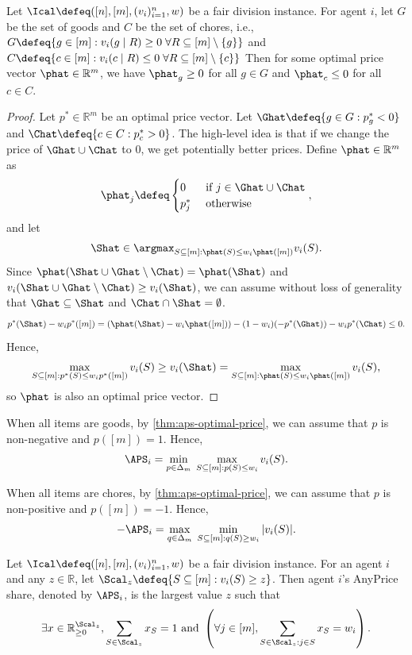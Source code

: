 \begin{lemma}
\label{thm:aps-optimal-price}
Let $\Ical \defeq ([n], [m], (v_i)_{i=1}^n, w)$ be a fair division instance.
For agent $i$, let $G$ be the set of goods and $C$ be the set of chores,
i.e., $G \defeq \{g \in [m]: v_i(g \mid R) \ge 0 \; \forall R \subseteq [m] \setminus \{g\}\}$
and $C \defeq \{c \in [m]: v_i(c \mid R) \le 0 \; \forall R \subseteq [m] \setminus \{c\}\}$
Then for some optimal price vector $\phat \in \mathbb{R}^m$, we have
$\phat_g \ge 0$ for all $g \in G$ and $\phat_c \le 0$ for all $c \in C$.
\end{lemma}
\begin{proof}
Let $p^* \in \mathbb{R}^m$ be an optimal price vector.
Let $\Ghat \defeq \{g \in G: p^*_g < 0\}$ and $\Chat \defeq \{c \in C: p^*_c > 0\}$.
%
The high-level idea is that if we change the price of $\Ghat \cup \Chat$ to 0,
we get potentially better prices.
%
Define $\phat \in \mathbb{R}^m$ as
\[ \phat_j \defeq \begin{cases}
0 & \textrm{ if } j \in \Ghat \cup \Chat
\\ p^*_j & \textrm{ otherwise}
\end{cases}, \]
and let
\[ \Shat \in \argmax_{S \subseteq [m]: \phat(S) \le w_i\phat([m])} v_i(S) .\]
Since $\phat(\Shat \cup \Ghat \setminus \Chat) = \phat(\Shat)$
and $v_i(\Shat \cup \Ghat \setminus \Chat) \ge v_i(\Shat)$,
we can assume without loss of generality that
$\Ghat \subseteq \Shat$ and $\Chat \cap \Shat = \emptyset$.
\[ p^*(\Shat) - w_ip^*([m])
= (\phat(\Shat) - w_i\phat([m])) - (1-w_i)(-p^*(\Ghat)) - w_ip^*(\Chat) \le 0. \]
Hence,
\[ \max_{S \subseteq [m]: p^*(S) \le w_ip^*([m])} v_i(S)
\ge v_i(\Shat) = \max_{S \subseteq [m]: \phat(S) \le w_i\phat([m])} v_i(S), \]
so $\phat$ is also an optimal price vector.
\end{proof}

When all items are goods, by \cref{thm:aps-optimal-price}, we can assume \wLoG{} that
$p$ is non-negative and $p([m]) = 1$. Hence,
\[ \APS_i = \min_{p \in \Delta_m}\;\max_{S \subseteq [m]: p(S) \le w_i} v_i(S). \]

When all items are chores, by \cref{thm:aps-optimal-price}, we can assume \wLoG{} that
$p$ is non-positive and $p([m]) = -1$. Hence,
\[ -\APS_i = \max_{q \in \Delta_m}\;\min_{S \subseteq [m]: q(S) \ge w_i} |v_i(S)|. \]

\begin{definition}
\label{defn:aps-dual}
Let $\Ical \defeq ([n], [m], (v_i)_{i=1}^n, w)$ be a fair division instance.
For an agent $i$ and any $z \in \mathbb{R}$, let $\Scal_z \defeq \{S \subseteq [m]: v_i(S) \ge z\}$.
Then agent $i$'s AnyPrice share, denoted by $\APS_i$, is the largest value $z$ such that
\[ \exists x \in \mathbb{R}_{\ge 0}^{\Scal_z}, \sum_{S \in \Scal_z} x_S = 1
    \textrm{ and } \left(\forall j \in [m], \sum_{S \in \Scal_z: j \in S} x_S = w_i\right). \]
\end{definition}

